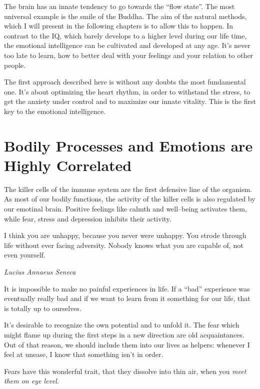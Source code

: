 \documentclass[../Book.Stress_regulation.tex]{subfiles}
\begin{document}
{  The brain has an innate tendency to go towards the ``flow state''. The most universal example is the smile of the Buddha.
  The aim of the natural methods, which I will present in the following chapters is to allow this to happen.
  In contrast to the IQ, which barely develops to a higher level during our life time, the emotional intelligence can be cultivated and developed at any age.
  It's never too late to learn, how to better deal with your feelings and your relation to other people.

  The first approach described here is without any doubts the most fundamental one.
  It's about optimizing the heart rhythm, in order to withstand the stress, to get the anxiety under control and to maximize our innate vitality.
  This is the first key to the emotional intelligence.
}

\section{Bodily Processes and Emotions are Highly Correlated}

The killer cells of the immune system are the first defensive line of the organism.
As most of our bodily functions, the activity of the killer cells is also regulated by our emotinal brain.
Positive feelings like calmth and well--being activates them, while fear, stress and depression inhibits their activity.

\epigraph{I think you are unhappy, because you  never were unhappy. You strode through life without ever facing adversity.
  Nobody knows what you are capable of, not even yourself.}{\textit{Lucius Annaeus Seneca}}

It is impossible to make no painful experiences in life.
If a ``bad'' experience was eventually really bad and if we want to learn from it something for our life, that is totally up to ourselves.

It's desirable to recognize the own potential and to unfold it.
The fear which might flame up during the first steps in a new direction are old acquaintances.
Out of that reason, we should include them into our lives as helpers: whenever I feel at unease, I know that something isn't in order.

Fears have this wonderful trait, that they dissolve into thin air, when you \emph{meet them on eye level}.
\end{document}
